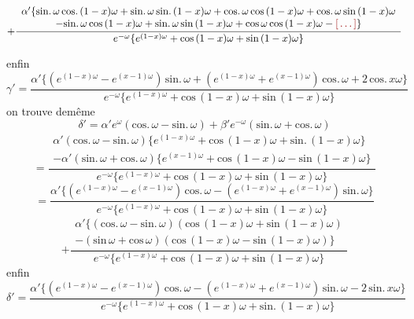 \documentclass[11pt,a4paper]{article}
\begin{document}
\[ + \frac{\begin{array}{c}\alpha'\{\text{sin.}\,\omega\,\text{cos.}\,(1-x)\omega + \text{sin.}\,\omega\,\text{sin.}\,(1-x)\omega + \text{cos.}\,\omega\,\text{cos}\,(1-x)\omega + \text{cos.}\,\omega\,\text{sin}\,(1-x)\omega \\  - \text{sin.}\,\omega\,\text{cos}\,(1-x)\omega + \text{sin.}\,\omega\,\text{sin}\,(1-x)\omega + \text{cos}\,\omega\,\text{cos}\,(1-x)\omega - \ill{}\}\end{array}}{e^{-\omega}\{e^{(1-x)\omega} + \text{cos}\,(1-x)\omega + \text{sin}\,(1-x)\omega\}} \]


enfin
\[ \gamma' = \frac{\alpha'\{(e^{(1-x)\omega} - e^{(x-1)\omega})\,\text{sin.}\,\omega + (e^{(1-x)\omega} + e^{(x-1)\omega})\,\text{cos.}\,\omega + 2\,\text{cos.}\,x\omega\}}{e^{-\omega}\{e^{(1-x)\omega} + \text{cos}\,(1-x)\omega + \text{sin}\,(1-x)\omega\}} \]
on trouve demême
\[ \delta' = \alpha' e^{\omega}(\text{cos.}\,\omega - \text{sin.}\,\omega) + \beta' e^{-\omega}(\text{sin.}\,\omega + \text{cos.}\,\omega) \]
\[ = \frac{\begin{array}{c}\alpha'(\text{cos.}\,\omega - \text{sin.}\,\omega)\{e^{(1-x)\omega} + \text{cos}\,(1-x)\omega + \text{sin.}\,(1-x)\omega\} \\  - \alpha'(\text{sin.}\,\omega + \text{cos.}\,\omega)\{e^{(x-1)\omega} + \text{cos}\,(1-x)\omega - \text{sin}\,(1-x)\omega\}\end{array}}{e^{-\omega}\{e^{(1-x)\omega} + \text{cos}\,(1-x)\omega + \text{sin}\,(1-x)\omega\}} \]
\[ = \frac{\alpha'\{(e^{(1-x)\omega} - e^{(x-1)\omega})\,\text{cos.}\,\omega - (e^{(1-x)\omega} + e^{(x-1)\omega})\,\text{sin.}\,\omega\}}{e^{-\omega}\{e^{(1-x)\omega} + \text{cos}\,(1-x)\omega + \text{sin}\,(1-x)\omega\}} \]
\[ + \frac{\begin{array}{c}\alpha'\{(\text{cos.}\,\omega - \text{sin.}\,\omega)(\text{cos}\,(1-x)\omega + \text{sin}\,(1-x)\omega) \\  - (\text{sin}\,\omega + \text{cos}\,\omega)(\text{cos}\,(1-x)\omega - \text{sin}\,(1-x)\omega)\}\end{array}}{e^{-\omega}\{e^{(1-x)\omega} + \text{cos}\,(1-x)\omega + \text{sin}\,(1-x)\omega\}} \]
enfin
\[ \delta' = \frac{\alpha'\{(e^{(1-x)\omega} - e^{(x-1)\omega})\,\text{cos.}\,\omega - (e^{(1-x)\omega} + e^{(x-1)\omega})\,\text{sin.}\,\omega - 2\,\text{sin.}\,x\omega\}}{e^{-\omega}\{e^{(1-x)\omega} + \text{cos}\,(1-x)\omega + \text{sin.}\,(1-x)\omega\}} \]
\end{document}
